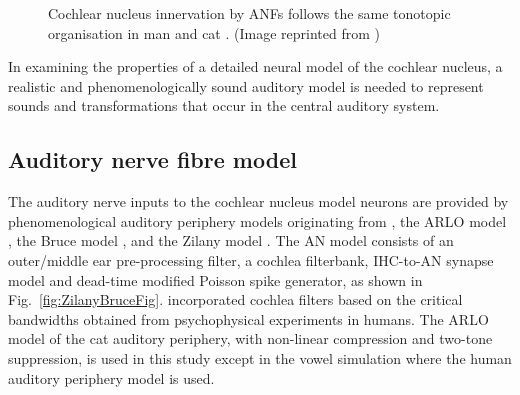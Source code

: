 
\begin{figure}[htb]
  \begin{center}
    \caption[Tonotopic innervation by ANFs in the CN of man and cat.]{Cochlear nucleus innervation by ANFs follows the same tonotopic organisation in man and cat
\citep{RyugoParks:2003,Ryugo:1992,Spoendlin:1973}. (Image reprinted from \citep{})}
    \label{fig:CN_Cat_Human}
  \end{center}
\end{figure}




%

In examining the properties of a detailed neural model of the cochlear nucleus, a realistic and phenomenologically sound auditory model is needed to represent sounds and transformations that occur in the central auditory system.

%
\subsection{Auditory nerve fibre model   \label{sec:CN:resp-audit-models}}

The auditory nerve inputs to the cochlear nucleus model neurons are provided by phenomenological auditory periphery models originating from \citet{Carney:1993},
the ARLO model \citep{HeinzZhangEtAl:2001}, the Bruce model \citep{BruceSachsEtAl:2003, ZilanyBruce:2006, ZilanyBruce:2007}, and the Zilany model \citep{ZilanyBruceEtAl:2009}.
The AN model consists of an outer\slash middle ear pre-processing filter, a cochlea filterbank, IHC-to-AN synapse model and dead-time modified Poisson spike generator, as shown in Fig.~\ref{fig:ZilanyBruceFig}.
\citet{HeinzZhangEtAl:2001} incorporated cochlea filters based on the critical bandwidths obtained from psychophysical experiments in humans.
The ARLO model of the cat auditory periphery, with non-linear compression and two-tone suppression, is used in this study except in the vowel simulation where the human auditory periphery model is used.

